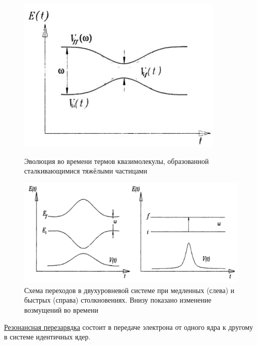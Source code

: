 \documentclass[10pt, a4paper]{article}
\begin{document}
\begin{figure}[h]
	\begin{center}
		\begin{minipage}[h]{0.49\linewidth}
			\includegraphics[width=1\linewidth]{heavy_particle.jpg}
			\caption{Эволюция во времени термов квазимолекулы, образованной сталкивающимися тяжёлыми частицами} 
			\label{fig:terms_quasimol}
		\end{minipage}
		\hfill
		\begin{minipage}[h]{0.49\linewidth}
			\includegraphics[width=1\linewidth]{2levels_transition.png}
			\caption{Схема переходов в двухуровневой системе при медленных (слева) и быстрых (справа) столкновениях. Внизу показано изменение возмущений во времени}
			\label{fig:transitions_2levels}
		\end{minipage}
	\end{center}
\end{figure}

\uline{Резонансная перезарядка} состоит в передаче электрона от одного ядра к другому в системе идентичных ядер.
\end{document}
